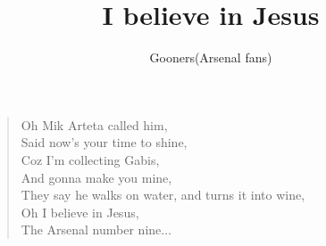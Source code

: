 \documentclass[a4paper,12pt]{article}
\title{I believe in Jesus}
\author{Gooners(Arsenal fans)}
\date{}
\begin{document}
	
	\maketitle
	
	\begin{verse}
		
		Oh Mik Arteta called him,  \\
		Said now’s your time to shine, \\ 
		Coz I’m collecting Gabis,  \\
		And gonna make you mine, \\
		They say he walks on water, and turns it into wine, \\
		Oh I believe in Jesus,  \\
		The Arsenal number nine$\ldots$
		
	\end{verse}
	
\end{document}
